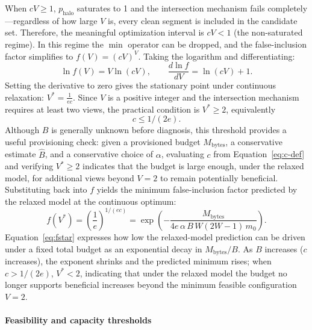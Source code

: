When $cV \ge 1$, $p_{\mathrm{halo}}$ saturates to 1 and the intersection mechanism fails completely---regardless of how large $V$ is, every clean segment is included in the candidate set. Therefore, the meaningful optimization interval is $cV < 1$ (the non-saturated regime). In this regime the $\min$ operator can be dropped, and the false-inclusion factor simplifies to $f(V) = (cV)^V$. Taking the logarithm and differentiating:
\[
\ln f(V) = V\ln(cV),\qquad
\frac{d\ln f}{dV} = \ln(cV) + 1.
\]
Setting the derivative to zero gives the stationary point under continuous relaxation:
$
V^* = \frac{1}{ec}.
$
Since $V$ is a positive integer and the intersection mechanism requires at least two views, the practical condition is $V^* \ge 2$, equivalently 
\begin{equation} \label{eq:c12e}
c \le 1/(2e).
\end{equation}
Although $B$ is generally unknown before diagnosis, this threshold  provides a useful provisioning check: given a provisioned budget $M_{\text{bytes}}$, a conservative estimate $\hat{B}$, and a conservative choice of $\alpha$, evaluating $c$ from Equation~\eqref{eq:c-def} and verifying $V^* \ge 2$ indicates that the budget is large enough, under the relaxed model, for additional views beyond $V{=}2$ to remain potentially beneficial.
Substituting back into $f$ yields the minimum false-inclusion factor predicted by the relaxed model at the continuous optimum:
\begin{equation}\label{eq:fstar}
f(V^*) = \left(\frac{1}{e}\right)^{1/(ec)}
= \exp\!\left(-\frac{M_{\text{bytes}}}
{4e\,\alpha\,B\,W(2W{-}1)\,m_0}\right).
\end{equation}
Equation~\eqref{eq:fstar} expresses how low the relaxed-model prediction can be driven under a fixed total budget as an exponential decay in $M_{\text{bytes}}/B$. As $B$ increases ($c$ increases), the exponent shrinks and the predicted minimum rises; when $c > 1/(2e)$, $V^* < 2$, indicating that under the relaxed model the budget no longer supports beneficial increases beyond the minimum feasible configuration $V{=}2$. 

\paragraph{Feasibility and capacity thresholds}
\label{sec:appendix-feasibility}


